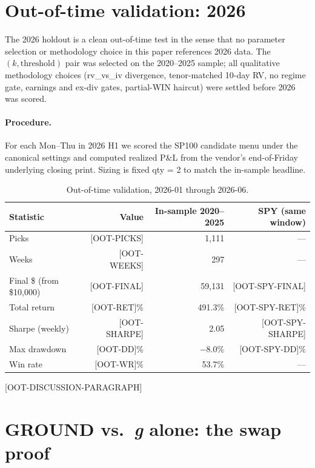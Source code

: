 \documentclass[11pt]{article}
\theoremstyle{definition}
\theoremstyle{remark}
\begin{document}
\section{Out-of-time validation: 2026}
\label{sec:oot}

The 2026 holdout is a clean out-of-time test in the sense that no
parameter selection or methodology choice in this paper references
2026 data. The $(k, \mathrm{threshold})$ pair was selected on the
2020--2025 sample; all qualitative methodology choices (rv\_vs\_iv
divergence, tenor-matched 10-day RV, no regime gate, earnings and
ex-div gates, partial-WIN haircut) were settled before 2026 was scored.

\paragraph{Procedure.}
For each Mon--Thu in 2026 H1 we scored the SP100 candidate menu under
the canonical settings and computed realized P\&L from the vendor's
end-of-Friday underlying closing print. Sizing is fixed qty = 2 to
match the in-sample headline.

\begin{table}[h]
\centering
\caption{Out-of-time validation, 2026-01 through 2026-06.}
\label{tab:oot}
\begin{tabular}{lrrr}
\toprule
Statistic & Value & In-sample 2020--2025 & SPY (same window) \\
\midrule
Picks                     & [OOT-PICKS]   & 1{,}111 & --- \\
Weeks                     & [OOT-WEEKS]   & 297     & --- \\
Final \$ (from \$10{,}000) & [OOT-FINAL]  & 59{,}131 & [OOT-SPY-FINAL] \\
Total return              & [OOT-RET]\%   & 491.3\%  & [OOT-SPY-RET]\% \\
Sharpe (weekly)           & [OOT-SHARPE]  & 2.05     & [OOT-SPY-SHARPE] \\
Max drawdown              & [OOT-DD]\%    & $-8.0\%$ & [OOT-SPY-DD]\% \\
Win rate                  & [OOT-WR]\%    & 53.7\%   & --- \\
\bottomrule
\end{tabular}
\end{table}

[OOT-DISCUSSION-PARAGRAPH]


\section{GROUND vs.\ \emph{g} alone: the swap proof}
\label{sec:proof}
\end{document}
